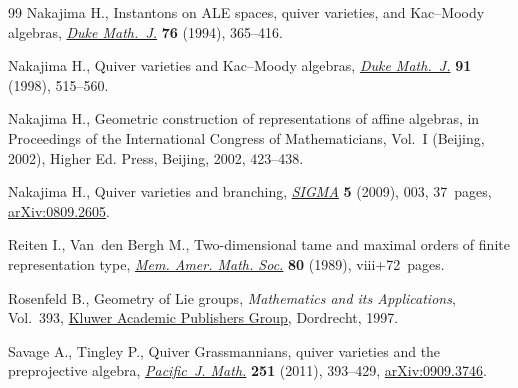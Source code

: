 \documentclass[10pt,a4paper]{amsart}
\numberwithin{equation}{section}
\begin{document}
\begin{thebibliography}{99}
Nakajima H., Instantons on {ALE} spaces, quiver varieties, and {K}ac--{M}oody
 algebras, \href{https://doi.org/10.1215/S0012-7094-94-07613-8}{\textit{Duke Math.~J.}} \textbf{76} (1994), 365--416.

Nakajima H., Quiver varieties and {K}ac--{M}oody algebras, \href{https://doi.org/10.1215/S0012-7094-98-09120-7}{\textit{Duke
 Math.~J.}} \textbf{91} (1998), 515--560.

Nakajima H., Geometric construction of representations of affine algebras, in
 Proceedings of the {I}nternational {C}ongress of {M}athematicians, {V}ol.~{I}
 ({B}eijing, 2002), Higher Ed. Press, Beijing, 2002, 423--438.

Nakajima H., Quiver varieties and branching, \href{https://doi.org/10.3842/SIGMA.2009.003}{\textit{SIGMA}} \textbf{5} (2009),
 003, 37~pages, \href{https://arxiv.org/abs/0809.2605}{arXiv:0809.2605}.

Reiten I., Van~den Bergh M., Two-dimensional tame and maximal orders of finite
 representation type, \href{https://doi.org/10.1090/memo/0408}{\textit{Mem. Amer. Math. Soc.}} \textbf{80} (1989),
 viii+72~pages.

Rosenfeld B., Geometry of {L}ie groups, \textit{Mathematics and its
 Applications}, Vol.~393, \href{https://doi.org/10.1007/978-1-4757-5325-7}{Kluwer Academic Publishers Group}, Dordrecht, 1997.

Savage A., Tingley P., Quiver {G}rassmannians, quiver varieties and the
 preprojective algebra, \href{https://doi.org/10.2140/pjm.2011.251.393}{\textit{Pacific~J. Math.}} \textbf{251} (2011),
 393--429, \href{https://arxiv.org/abs/0909.3746}{arXiv:0909.3746}.

\end{thebibliography}
\end{document}
